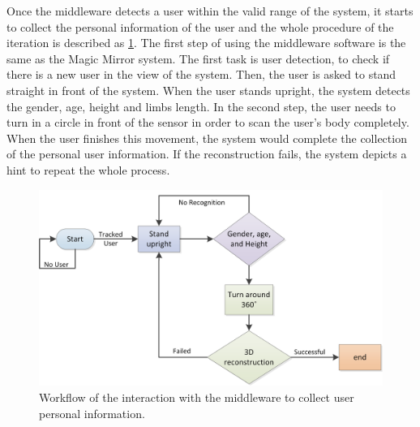 Once the middleware detects a user within the valid range of the system, it starts to collect the personal information of the user and the whole procedure of the iteration is described as \figurename{\ref{fig:3-PRMM:InteractionWithMiddleware}}.
The first step of using the middleware software is the same as the Magic Mirror system. The first task is user detection, to check if there is a new user in the view of the system. Then, the user is asked to stand straight in front of the system. When the user stands upright, the system detects the gender, age, height and limbs length. 
In the second step, the user needs to turn in a circle in front of the sensor in order to scan the user's body completely. When the user finishes this movement, the system would complete the collection of the personal user information. If the reconstruction fails, the system depicts a hint to repeat the whole process.
\begin{figure}
	\centering
	\includegraphics[width=0.75\linewidth]{figures/3-PRMM/InteractionWithMiddleware.png}
	\caption{Workflow of the interaction with the middleware to collect user personal information.}
	\label{fig:3-PRMM:InteractionWithMiddleware}
\end{figure}

